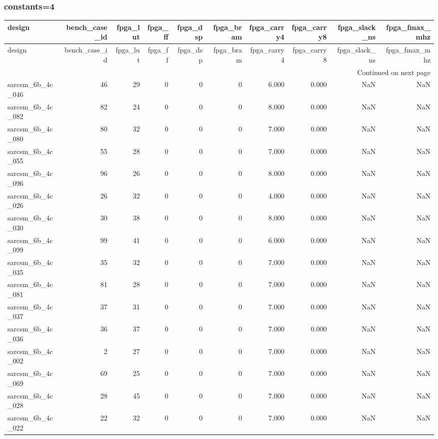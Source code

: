 \documentclass{article}
\begin{document}
\subsubsection*{constants=4}
\begin{longtable}{lrrrrrrrrr}
\toprule
design & bench\_case\_id & fpga\_lut & fpga\_ff & fpga\_dsp & fpga\_bram & fpga\_carry4 & fpga\_carry8 & fpga\_slack\_ns & fpga\_fmax\_mhz \\
\midrule
\endfirsthead
\toprule
design & bench\_case\_id & fpga\_lut & fpga\_ff & fpga\_dsp & fpga\_bram & fpga\_carry4 & fpga\_carry8 & fpga\_slack\_ns & fpga\_fmax\_mhz \\
\midrule
\endhead
\midrule
\multicolumn{10}{r}{Continued on next page} \\
\midrule
\endfoot
\bottomrule
\endlastfoot
sarcsm\_6b\_4c\_046 & 46 & 29 & 0 & 0 & 0 & 6.000 & 0.000 & NaN & NaN \\
sarcsm\_6b\_4c\_082 & 82 & 24 & 0 & 0 & 0 & 8.000 & 0.000 & NaN & NaN \\
sarcsm\_6b\_4c\_080 & 80 & 32 & 0 & 0 & 0 & 7.000 & 0.000 & NaN & NaN \\
sarcsm\_6b\_4c\_055 & 55 & 28 & 0 & 0 & 0 & 7.000 & 0.000 & NaN & NaN \\
sarcsm\_6b\_4c\_096 & 96 & 26 & 0 & 0 & 0 & 8.000 & 0.000 & NaN & NaN \\
sarcsm\_6b\_4c\_026 & 26 & 32 & 0 & 0 & 0 & 4.000 & 0.000 & NaN & NaN \\
sarcsm\_6b\_4c\_030 & 30 & 38 & 0 & 0 & 0 & 8.000 & 0.000 & NaN & NaN \\
sarcsm\_6b\_4c\_099 & 99 & 41 & 0 & 0 & 0 & 6.000 & 0.000 & NaN & NaN \\
sarcsm\_6b\_4c\_035 & 35 & 32 & 0 & 0 & 0 & 7.000 & 0.000 & NaN & NaN \\
sarcsm\_6b\_4c\_081 & 81 & 28 & 0 & 0 & 0 & 7.000 & 0.000 & NaN & NaN \\
sarcsm\_6b\_4c\_037 & 37 & 31 & 0 & 0 & 0 & 7.000 & 0.000 & NaN & NaN \\
sarcsm\_6b\_4c\_036 & 36 & 37 & 0 & 0 & 0 & 7.000 & 0.000 & NaN & NaN \\
sarcsm\_6b\_4c\_002 & 2 & 27 & 0 & 0 & 0 & 7.000 & 0.000 & NaN & NaN \\
sarcsm\_6b\_4c\_069 & 69 & 25 & 0 & 0 & 0 & 7.000 & 0.000 & NaN & NaN \\
sarcsm\_6b\_4c\_028 & 28 & 45 & 0 & 0 & 0 & 7.000 & 0.000 & NaN & NaN \\
sarcsm\_6b\_4c\_022 & 22 & 32 & 0 & 0 & 0 & 7.000 & 0.000 & NaN & NaN \\

\end{longtable}
\end{document}
